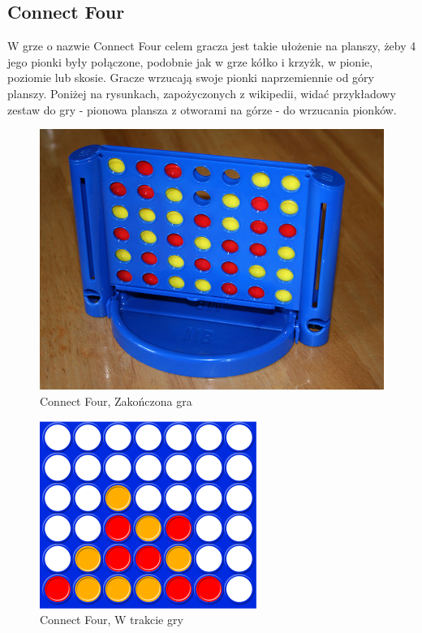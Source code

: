 \documentclass[polish,shortabstract,inz]{iithesis}
\begin{document}
\subsection{Connect Four}
W grze o nazwie Connect Four celem gracza jest takie ułożenie na planszy, żeby 4 jego pionki były połączone, podobnie jak w grze kółko i krzyżk, w pionie, poziomie lub skosie.
Gracze wrzucają swoje pionki naprzemiennie od góry planszy.
Poniżej na rysunkach, zapożyczonych z wikipedii, widać przykładowy zestaw do gry - pionowa plansza z otworami na górze - do wrzucania pionków.

\begin{figure}[H]
  \includegraphics[scale=0.25]{./images/connect4.jpg}
  \centering
  \caption{Connect Four, Zakończona gra}
  \label{fig:c4}
\end{figure}
\begin{figure}[H]
  \includegraphics[scale=0.5]{./images/connect4.png}
  \centering
  \caption{Connect Four, W trakcie gry}
  \label{fig:c4_2}
\end{figure}
\end{document}
